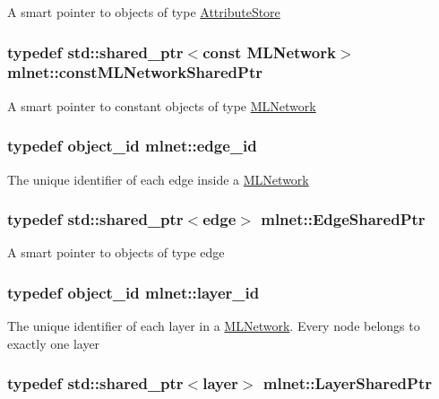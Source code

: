 A smart pointer to objects of type \hyperlink{classmlnet_1_1_attribute_store}{Attribute\+Store} \hypertarget{namespacemlnet_ae262c8b9dd013ed449c114a5dfba5743}{
\subsubsection[{const\+M\+L\+Network\+Shared\+Ptr}]{\setlength{\rightskip}{0pt plus 5cm}typedef std\+::shared\+\_\+ptr$<$const {\bf M\+L\+Network}$>$ {\bf mlnet\+::const\+M\+L\+Network\+Shared\+Ptr}}}\label{namespacemlnet_ae262c8b9dd013ed449c114a5dfba5743}
A smart pointer to constant objects of type \hyperlink{classmlnet_1_1_m_l_network}{M\+L\+Network} \hypertarget{namespacemlnet_ad708e58e72680351e102e6b3d0489145}{
\subsubsection[{edge\+\_\+id}]{\setlength{\rightskip}{0pt plus 5cm}typedef {\bf object\+\_\+id} {\bf mlnet\+::edge\+\_\+id}}}\label{namespacemlnet_ad708e58e72680351e102e6b3d0489145}
The unique identifier of each edge inside a \hyperlink{classmlnet_1_1_m_l_network}{M\+L\+Network} \hypertarget{namespacemlnet_a33e88c3df9bea691a269d5e5d8bea57d}{
\subsubsection[{Edge\+Shared\+Ptr}]{\setlength{\rightskip}{0pt plus 5cm}typedef std\+::shared\+\_\+ptr$<${\bf edge}$>$ {\bf mlnet\+::\+Edge\+Shared\+Ptr}}}\label{namespacemlnet_a33e88c3df9bea691a269d5e5d8bea57d}
A smart pointer to objects of type edge \hypertarget{namespacemlnet_a84ad9c6056f0eb7d129995351f9b13fb}{
\subsubsection[{layer\+\_\+id}]{\setlength{\rightskip}{0pt plus 5cm}typedef {\bf object\+\_\+id} {\bf mlnet\+::layer\+\_\+id}}}\label{namespacemlnet_a84ad9c6056f0eb7d129995351f9b13fb}
The unique identifier of each layer in a \hyperlink{classmlnet_1_1_m_l_network}{M\+L\+Network}. Every node belongs to exactly one layer \hypertarget{namespacemlnet_a10c007fb811c55339dd5b9d32bb0505d}{
\subsubsection[{Layer\+Shared\+Ptr}]{\setlength{\rightskip}{0pt plus 5cm}typedef std\+::shared\+\_\+ptr$<${\bf layer}$>$ {\bf mlnet\+::\+Layer\+Shared\+Ptr}}}\label{namespacemlnet_a10c007fb811c55339dd5b9d32bb0505d}
